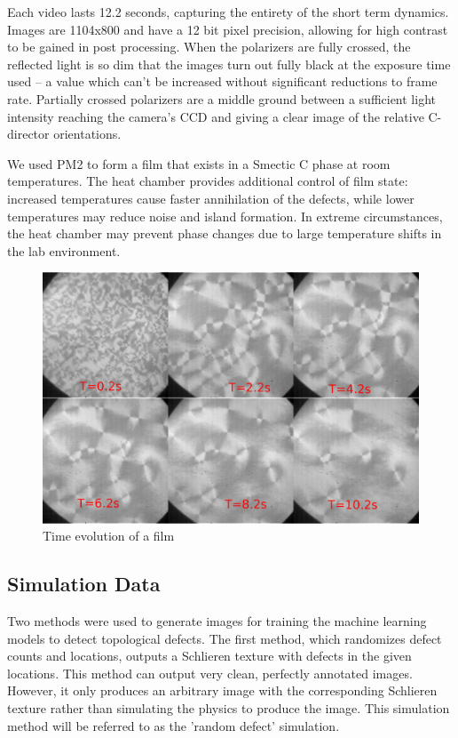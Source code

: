 \documentclass[prl,reprint,showpacs,floatfix,nofootinbib]{revtex4-1}
\begin{document}
Each video lasts 12.2 seconds, capturing the entirety of the short term dynamics. Images are 1104x800 and have a 12 bit pixel precision, allowing for high contrast to be gained in post processing. When the polarizers are fully crossed, the reflected light is so dim that the images turn out fully black at the exposure time used -- a value which can't be increased without significant reductions to frame rate. Partially crossed polarizers are a middle ground between a sufficient light intensity reaching the camera's CCD and giving a clear image of the relative C-director orientations.

We used PM2\cite{harth_episodes_2016} to form a film that exists in a Smectic C phase at room temperatures. The heat chamber provides additional control of film state: increased temperatures cause faster annihilation of the defects, while lower temperatures may reduce noise and island formation. In extreme circumstances, the heat chamber may prevent phase changes due to large temperature shifts in the lab environment. 

\begin{figure}
  \includegraphics[width=\linewidth]{film.png}
  \caption{Time evolution of a film}
  \label{fig:frames}
\end{figure}

\subsection{Simulation Data}

Two methods were used to generate images for training the machine learning models to detect topological defects. The first method, which randomizes defect counts and locations, outputs a Schlieren\cite{nehring_schlieren_1972} texture with defects in the given locations. This method can output very clean, perfectly annotated images. However, it only produces an arbitrary image with the corresponding Schlieren texture rather than simulating the physics to produce the image. This simulation method will be referred to as the 'random defect' simulation.
\end{document}

